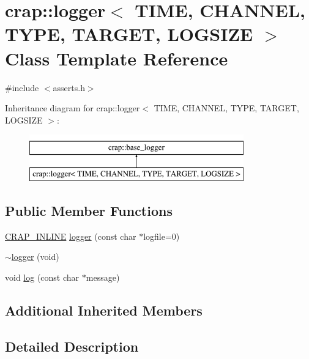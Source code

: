 \hypertarget{classcrap_1_1logger}{}\section{crap\+:\+:logger$<$ T\+I\+M\+E, C\+H\+A\+N\+N\+E\+L, T\+Y\+P\+E, T\+A\+R\+G\+E\+T, L\+O\+G\+S\+I\+Z\+E $>$ Class Template Reference}
\label{classcrap_1_1logger}


{\ttfamily \#include $<$asserts.\+h$>$}

Inheritance diagram for crap\+:\+:logger$<$ T\+I\+M\+E, C\+H\+A\+N\+N\+E\+L, T\+Y\+P\+E, T\+A\+R\+G\+E\+T, L\+O\+G\+S\+I\+Z\+E $>$\+:\begin{figure}[H]
\begin{center}
\leavevmode
\includegraphics[height=2.000000cm]{classcrap_1_1logger}
\end{center}
\end{figure}
\subsection*{Public Member Functions}
\begin{DoxyCompactItemize}
\item 
\hyperlink{config__x86_8h_a5a40526b8d842e7ff731509998bb0f1c}{C\+R\+A\+P\+\_\+\+I\+N\+L\+I\+N\+E} \hyperlink{classcrap_1_1logger_a8b9496b51fe6c663cf8ae93c8b5aadbd}{logger} (const char $\ast$logfile=0)
\item 
\hyperlink{classcrap_1_1logger_a1d22a50f852b80fbfb466b2226303277}{$\sim$logger} (void)
\item 
void \hyperlink{classcrap_1_1logger_a63f7fa062e702eda3f9c974753980f7a}{log} (const char $\ast$message)
\end{DoxyCompactItemize}
\subsection*{Additional Inherited Members}


\subsection{Detailed Description}

